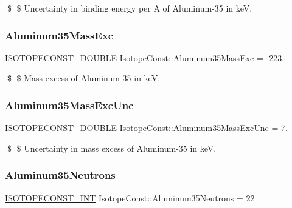 \$ \$ Uncertainty in binding energy per A of Aluminum-\/35 in keV. \mbox{\label{group___isotope_const-_aluminum-_al35_ga9a46f913645add43eef43ad8115b4829}} 
\subsubsection{\texorpdfstring{Aluminum35\+Mass\+Exc}{Aluminum35MassExc}}
{\footnotesize\ttfamily \mbox{\hyperlink{group___isotope_const-_macros_ga8f45a7272ce02c0b4c65c44636ed719a}{I\+S\+O\+T\+O\+P\+E\+C\+O\+N\+S\+T\+\_\+\+D\+O\+U\+B\+LE}} Isotope\+Const\+::\+Aluminum35\+Mass\+Exc = -\/223.}

\$ \$ Mass excess of Aluminum-\/35 in keV. \mbox{\label{group___isotope_const-_aluminum-_al35_ga70171b6b50c949bcb4bf10e3c64fc122}} 
\subsubsection{\texorpdfstring{Aluminum35\+Mass\+Exc\+Unc}{Aluminum35MassExcUnc}}
{\footnotesize\ttfamily \mbox{\hyperlink{group___isotope_const-_macros_ga8f45a7272ce02c0b4c65c44636ed719a}{I\+S\+O\+T\+O\+P\+E\+C\+O\+N\+S\+T\+\_\+\+D\+O\+U\+B\+LE}} Isotope\+Const\+::\+Aluminum35\+Mass\+Exc\+Unc = 7.}

\$ \$ Uncertainty in mass excess of Aluminum-\/35 in keV. \mbox{\label{group___isotope_const-_aluminum-_al35_ga517cc0da85708f6dd6776a9dcfbcdf18}} 
\subsubsection{\texorpdfstring{Aluminum35\+Neutrons}{Aluminum35Neutrons}}
{\footnotesize\ttfamily \mbox{\hyperlink{group___isotope_const-_macros_ga5f18360b3e99483a35c32d789e62621c}{I\+S\+O\+T\+O\+P\+E\+C\+O\+N\+S\+T\+\_\+\+I\+NT}} Isotope\+Const\+::\+Aluminum35\+Neutrons = 22}

